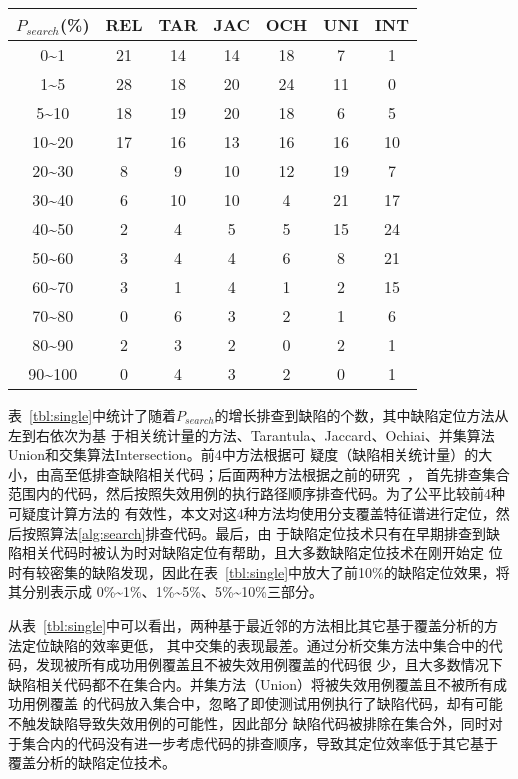 \begin{center}
\zihaowu
{}\label{tbl:single}
\begin{tabular}{ccccccc}
\toprule
$P_{search}$(\%) & REL & TAR & JAC & OCH & UNI & INT\\ \midrule
0\textasciitilde1 & 21 & 14 & 14 & 18 & 7 & 1 \\ 
1\textasciitilde5 & 28 & 18 & 20 & 24 & 11 & 0 \\ 
5\textasciitilde10 & 18 & 19 & 20 & 18 & 6 & 5 \\ 
10\textasciitilde20 & 17 & 16 & 13 & 16 & 16 & 10 \\ 
20\textasciitilde30 & 8 & 9 & 10 & 12 & 19 & 7 \\ 
30\textasciitilde40 & 6 & 10 & 10 & 4 & 21 & 17 \\ 
40\textasciitilde50 & 2 & 4 & 5 & 5 & 15 & 24 \\ 
50\textasciitilde60 & 3 & 4 & 4 & 6 & 8 & 21 \\ 
60\textasciitilde70 & 3 & 1 & 4 & 1 & 2 & 15 \\ 
70\textasciitilde80 & 0 & 6 & 3 & 2 & 1 & 6 \\ 
80\textasciitilde90 & 2 & 3 & 2 & 0 & 2 & 1 \\ 
90\textasciitilde100 & 0 & 4 & 3 & 2 & 0 & 1 \\ 
\bottomrule
\end{tabular}
\end{center}

表~\ref{tbl:single}中统计了随着$P_{search}$的增长排查到缺陷的个数，其中缺陷定位方法从左到右依次为基
于相关统计量的方法、Tarantula、Jaccard、Ochiai、并集算法Union和交集算法Intersection。前4中方法根据可
疑度（缺陷相关统计量）的大小，由高至低排查缺陷相关代码；后面两种方法根据之前的研究~\cite{wen2013}，
首先排查集合范围内的代码，然后按照失效用例的执行路径顺序排查代码。为了公平比较前4种可疑度计算方法的
有效性，本文对这4种方法均使用分支覆盖特征谱进行定位，然后按照算法\ref{alg:search}排查代码。最后，由
于缺陷定位技术只有在早期排查到缺陷相关代码时被认为时对缺陷定位有帮助，且大多数缺陷定位技术在刚开始定
位时有较密集的缺陷发现，因此在表~\ref{tbl:single}中放大了前10\%的缺陷定位效果，将其分别表示成
0\%\textasciitilde1\%、1\%\textasciitilde5\%、5\%\textasciitilde10\%三部分。

从表~\ref{tbl:single}中可以看出，两种基于最近邻的方法相比其它基于覆盖分析的方法定位缺陷的效率更低，
其中交集的表现最差。通过分析交集方法中集合中的代码，发现被所有成功用例覆盖且不被失效用例覆盖的代码很
少，且大多数情况下缺陷相关代码都不在集合内。并集方法（Union）将被失效用例覆盖且不被所有成功用例覆盖
的代码放入集合中，忽略了即使测试用例执行了缺陷代码，却有可能不触发缺陷导致失效用例的可能性，因此部分
缺陷代码被排除在集合外，同时对于集合内的代码没有进一步考虑代码的排查顺序，导致其定位效率低于其它基于
覆盖分析的缺陷定位技术。

